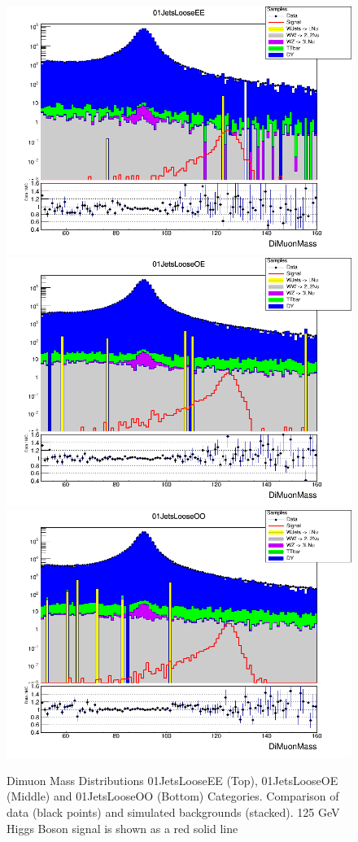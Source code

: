 \begin{figure}[htbp]
  \centering
  \includegraphics[width=0.65\linewidth]{figures/ch_higgs/distributions/baseline_kalman/distribution__01JetsLooseEE__DiMuonMass__logY.png}\\
  \includegraphics[width=0.65\linewidth]{figures/ch_higgs/distributions/baseline_kalman/distribution__01JetsLooseOE__DiMuonMass__logY.png}\\
  \includegraphics[width=0.65\linewidth]{figures/ch_higgs/distributions/baseline_kalman/distribution__01JetsLooseOO__DiMuonMass__logY.png}
  \caption{Dimuon Mass Distributions 01JetsLooseEE (Top), 01JetsLooseOE (Middle) and 01JetsLooseOO (Bottom) Categories. Comparison of data (black points) and simulated backgrounds (stacked). 125 GeV Higgs Boson signal is shown as a red solid line}
  \label{fig:higgs_categorization_01jetslooseeeeooo}
\end{figure}

